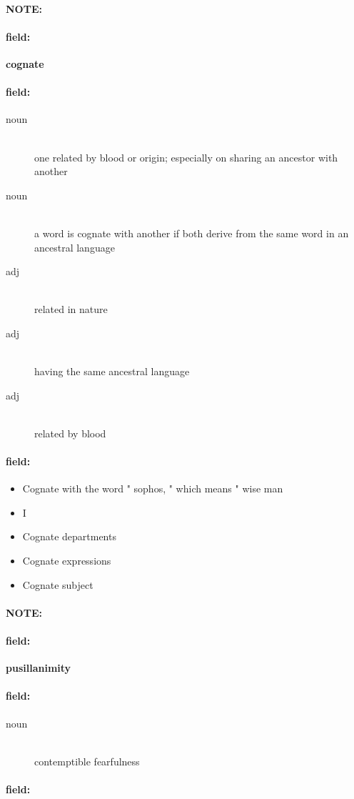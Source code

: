 \documentclass[12pt]{article}
\newenvironment{note}{\paragraph{NOTE:}}{}
\newenvironment{field}{\paragraph{field:}}{}
\begin{document}
\begin{note}
\begin{field}
\textbf{\large cognate}
\end{field}


\begin{field}
\begin{description}
\item[noun] \hfill \\ 
one related by blood or origin; especially on sharing an ancestor with another

\item[noun] \hfill \\ 
a word is cognate with another if both derive from the same word in an ancestral language

\item[adj] \hfill \\ 
related in nature

\item[adj] \hfill \\ 
having the same ancestral language

\item[adj] \hfill \\ 
related by blood

\end{description}
\end{field}

\begin{field}
\begin{itemize}
\item Cognate with the word " sophos, " which means " wise man
\item I
\item Cognate departments
\item Cognate expressions
\item Cognate subject
\end{itemize}
\end{field}
\end{note}
\begin{note}
\begin{field}
\textbf{\large pusillanimity}
\end{field}


\begin{field}
\begin{description}
\item[noun] \hfill \\ 
contemptible fearfulness

\end{description}
\end{field}

\begin{field}
\end{field}
\end{note}
\end{document}

